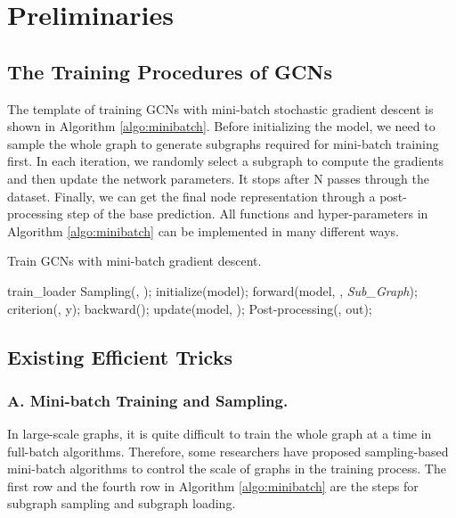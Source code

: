 \documentclass[runningheads]{llncs}
\begin{document}
\section{Preliminaries}\label{preliminaries}

\subsection{The Training Procedures of
GCNs}

The template of training GCNs with mini-batch
stochastic gradient descent is shown in Algorithm \ref{algo:minibatch}. Before initializing the model, we need to sample the whole graph to generate subgraphs required for mini-batch training first. In each iteration, we randomly select a subgraph to compute the gradients and then update the network parameters. It stops after N passes through the dataset. Finally, we can get the final node representation  through a post-processing step 
of the base prediction. All functions
and hyper-parameters in Algorithm \ref{algo:minibatch} can be implemented
in many different ways. 


\begin{algorithm}[h]
\caption{Train GCNs with mini-batch gradient descent.}
\label{algo:minibatch}
\begin{algorithmic}[1]
\STATE train\_loader  Sampling(, );
\STATE initialize(model);
        \STATE   forward(model, , \emph{Sub\_Graph});
        \STATE   criterion(, y);
        \STATE   backward();
        \STATE update(model, );
    \ENDFOR
\ENDFOR
\STATE   Post-processing(, out);
\end{algorithmic}
\end{algorithm}

\subsection{Existing Efficient
Tricks}

\subsubsection{A. Mini-batch Training and
Sampling.} 
In large-scale graphs, it is quite difficult to train the whole graph
at a time in full-batch algorithms. Therefore, some researchers have
proposed sampling-based mini-batch algorithms to control the scale of graphs in the training process. The first
row and the fourth row in Algorithm \ref{algo:minibatch} are the steps for subgraph
sampling and subgraph loading.
\end{document}
